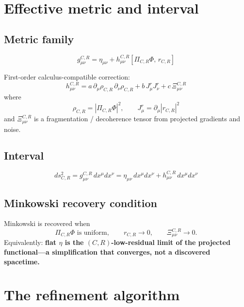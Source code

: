 \documentclass[11pt,a4paper]{article}
\newcommand{\Ph}{\Phi}
\begin{document}
\section{Effective metric and interval}

\subsection{Metric family}

\begin{equation}
  g^{C,R}_{\mu\nu} = \eta_{\mu\nu} + h^{C,R}_{\mu\nu}[\Pi_{C,R}\Ph,\, r_{C,R}]
  \label{eq:metric}
\end{equation}

First-order calculus-compatible correction:
\begin{equation}
  h^{C,R}_{\mu\nu} = a\,\partial_\mu \rho_{C,R}\,\partial_\nu \rho_{C,R}
  + b\, J^r_\mu J^r_\nu + c\, \Xi^{C,R}_{\mu\nu}
  \label{eq:h-correction}
\end{equation}
where
\begin{equation}
  \rho_{C,R} = |\Pi_{C,R}\Ph|^2, \qquad J^r_\mu = \partial_\mu |r_{C,R}|^2
\end{equation}
and $\Xi^{C,R}_{\mu\nu}$ is a fragmentation / decoherence tensor from projected gradients and noise.

\subsection{Interval}

\begin{equation}
  ds^2_{C,R} = g^{C,R}_{\mu\nu}\, dx^\mu dx^\nu
  = \eta_{\mu\nu}\, dx^\mu dx^\nu + h^{C,R}_{\mu\nu}\, dx^\mu dx^\nu
\end{equation}

\subsection{Minkowski recovery condition}

Minkowski is recovered when
\begin{equation}
  \Pi_{C,R}\Ph \text{ is uniform}, \qquad r_{C,R} \to 0, \qquad \Xi^{C,R}_{\mu\nu} \to 0.
\end{equation}
Equivalently: \textbf{flat $\eta$ is the $(C,R)$-low-residual limit of the projected functional---a simplification that converges, not a discovered spacetime.}

\section{The refinement algorithm}
\end{document}
